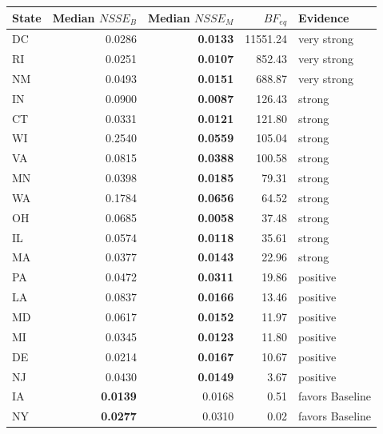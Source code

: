 
\begin{tabular}{lrrrl}
\toprule
State & Median $NSSE_{B}$ & Median $NSSE_{M}$ & $BF_{eq}$ & Evidence\\
\midrule
DC & 0.0286 & \textbf{0.0133} & 11551.24 & very strong\\
RI & 0.0251 & \textbf{0.0107} & 852.43 & very strong\\
NM & 0.0493 & \textbf{0.0151} & 688.87 & very strong\\
IN & 0.0900 & \textbf{0.0087} & 126.43 & strong\\
CT & 0.0331 & \textbf{0.0121} & 121.80 & strong\\
\addlinespace
WI & 0.2540 & \textbf{0.0559} & 105.04 & strong\\
VA & 0.0815 & \textbf{0.0388} & 100.58 & strong\\
MN & 0.0398 & \textbf{0.0185} & 79.31 & strong\\
WA & 0.1784 & \textbf{0.0656} & 64.52 & strong\\
OH & 0.0685 & \textbf{0.0058} & 37.48 & strong\\
\addlinespace
IL & 0.0574 & \textbf{0.0118} & 35.61 & strong\\
MA & 0.0377 & \textbf{0.0143} & 22.96 & strong\\
PA & 0.0472 & \textbf{0.0311} & 19.86 & positive\\
LA & 0.0837 & \textbf{0.0166} & 13.46 & positive\\
MD & 0.0617 & \textbf{0.0152} & 11.97 & positive\\
\addlinespace
MI & 0.0345 & \textbf{0.0123} & 11.80 & positive\\
DE & 0.0214 & \textbf{0.0167} & 10.67 & positive\\
NJ & 0.0430 & \textbf{0.0149} & 3.67 & positive\\
IA & \textbf{0.0139} & 0.0168 & 0.51 & favors Baseline\\
NY & \textbf{0.0277} & 0.0310 & 0.02 & favors Baseline\\
\bottomrule
\end{tabular}

